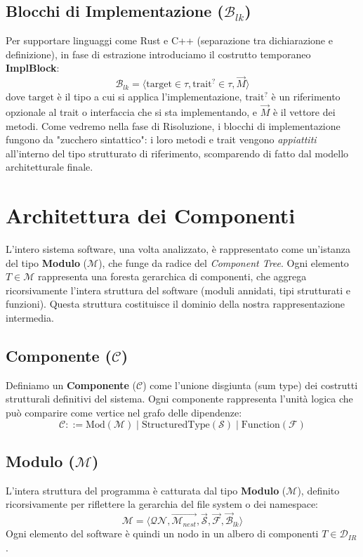 \subsection{Blocchi di Implementazione ($\mathcal{B}_{lk}$)}
Per supportare linguaggi come Rust e C++ (separazione tra
dichiarazione e definizione), in fase di estrazione introduciamo il
costrutto temporaneo \textbf{ImplBlock}:
$$\mathcal{B}_{lk} = \langle \text{target} \in \tau, \text{trait}^?
\in \tau, \vec{M} \rangle$$
dove $\text{target}$ è il tipo a cui si applica l'implementazione,
$\text{trait}^?$ è un riferimento opzionale al trait o interfaccia
che si sta implementando, e $\vec{M}$ è il vettore dei metodi.
Come vedremo nella fase di Risoluzione, i blocchi di implementazione
fungono da "zucchero sintattico": i loro metodi e trait vengono
\textit{appiattiti} all'interno del tipo strutturato di riferimento,
scomparendo di fatto dal modello architetturale finale.

\section{Architettura dei Componenti}
L'intero sistema software, una volta analizzato, è rappresentato come
un'istanza del tipo \textbf{Modulo} ($\mathcal{M}$), che funge da
radice del \textit{Component Tree}. Ogni elemento $T \in \mathcal{M}$
rappresenta una foresta gerarchica di componenti, che aggrega
ricorsivamente l'intera struttura del software (moduli annidati, tipi
strutturati e funzioni). Questa struttura costituisce il dominio
della nostra rappresentazione intermedia.

\subsection{Componente ($\mathcal{C}$)}
Definiamo un \textbf{Componente} ($\mathcal{C}$) come l'unione
disgiunta (sum type) dei costrutti strutturali definitivi del
sistema. Ogni componente rappresenta l'unità logica che può comparire
come vertice nel grafo delle dipendenze:
$$\mathcal{C} ::= \text{Mod}(\mathcal{M}) \mid
\text{StructuredType}(\mathcal{S}) \mid \text{Function}(\mathcal{F})$$

\subsection{Modulo ($\mathcal{M}$)}
L'intera struttura del programma è catturata dal tipo \textbf{Modulo}
($\mathcal{M}$), definito ricorsivamente per riflettere la gerarchia
del file system o dei namespace:
$$\mathcal{M} = \langle \mathcal{QN}, \vec{\mathcal{M}_{nest}},
\vec{\mathcal{S}}, \vec{\mathcal{F}}, \vec{\mathcal{B}}_{lk} \rangle$$
Ogni elemento del software è quindi un nodo in un albero di
componenti $T \in \mathcal{D}_{IR}$.

